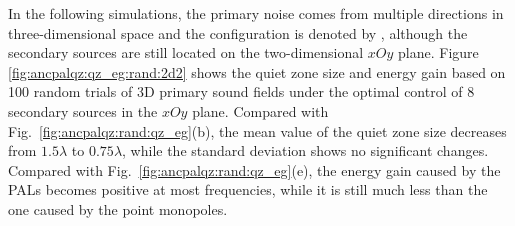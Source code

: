 In the following simulations, the primary noise comes from multiple directions in three-dimensional space and the configuration is denoted by , 
although the secondary sources are still located on the two-dimensional $xOy$ plane. 
Figure \ref{fig:ancpalqz:qz_eg:rand:2d2} shows the quiet zone size and energy gain based on 100 random trials of 3D primary sound fields under the optimal control of 8 secondary sources in the $xOy$ plane. 
Compared with Fig.~\ref{fig:ancpalqz:rand:qz_eg}(b), the mean value of the quiet zone size decreases from $1.5\lambda$ to $0.75\lambda$, 
while the standard deviation shows no significant changes. 
Compared with Fig.~\ref{fig:ancpalqz:rand:qz_eg}(e), the energy gain caused by the PALs becomes positive at most frequencies, while it is still much less than the one caused by the point monopoles.

